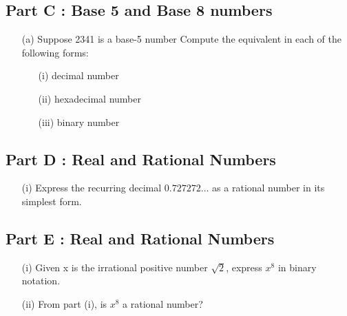 \subsection*{Part C : Base 5 and Base 8 numbers}
\begin{itemize}
\item[(a)] Suppose 2341 is a base-5 number
Compute the equivalent in each of the following forms:
\begin{itemize}
\item[(i)] decimal number
\item[(ii)] hexadecimal number
\item[(iii)] binary number
\end{itemize}

\end{itemize}
\subsection*{Part D : Real and Rational Numbers}
\begin{itemize}
\item[(i)] Express the recurring decimal $0.727272\ldots$ as a rational number in its simplest form.
\end{itemize}
\subsection*{Part E : Real and Rational Numbers}
\begin{itemize}
\item[(i)] Given x is the irrational positive number $\sqrt{2}$, express $x^8$ in binary notation.
\item[(ii)] From part (i), is $x^8$ a rational number?
\end{itemize}

